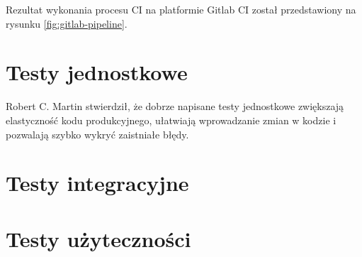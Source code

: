\par
Rezultat wykonania procesu CI na platformie Gitlab CI został przedstawiony na rysunku \ref{fig:gitlab-pipeline}.


\section{Testy jednostkowe}

Robert C. Martin stwierdził, że dobrze napisane testy jednostkowe zwiększają elastyczność kodu produkcyjnego, ułatwiają wprowadzanie zmian w kodzie i pozwalają szybko wykryć zaistniałe błędy\cite{book:czysty-kod}.

\cite{book:testy-jednostkowe}
\section{Testy integracyjne}
\cite{book:testy-jednostkowe}
\section{Testy użyteczności}
\cite{book:testowanie-i-jakosc-oprogramowania}

\thispagestyle{normal}

